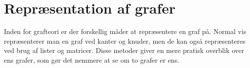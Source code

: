 \section{Repræsentation af grafer}
Inden for grafteori er der forskellig måder at repræsentere en graf på. Normal vis repræsenterer man en graf ved kanter og knuder, men de kan også repræsenteres ved brug af lister og matricer. Disse metoder giver en mere pratisk overblik over ens grafer, som gør det nemmere at se om to grafer er ens.
